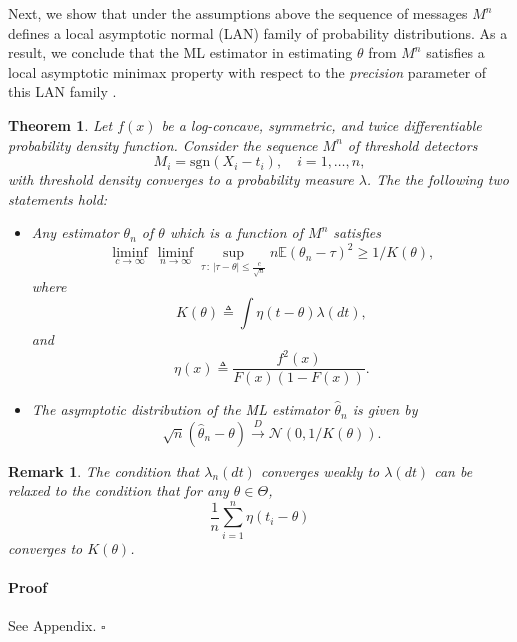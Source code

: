 \documentclass[letterpaper, conference, 11pt]{IEEEtran}      %
\newtheorem{thm}{\bf{Theorem}}
\newtheorem{rem}{\bf {Remark}}
\newenvironment{proof}{\paragraph*{Proof}}{\hfill$\square$ \newline}
\newcommand{\sgn}{\mathrm{sgn} }
\begin{document}
Next, we show that under the assumptions above the sequence of messages $M^n$ defines a local asymptotic normal (LAN) family of probability distributions. As a result, we conclude that the ML estimator in estimating $\theta$ from $M^n$ satisfies a local asymptotic minimax property with respect to the \emph{precision} parameter of this LAN family \cite{van2000asymptotic}. 
\begin{thm} \label{thm:LAN}
Let $f(x)$ be a log-concave, symmetric, and twice differentiable probability density function. Consider the sequence $M^n$ of threshold detectors 
\[
M_i = \sgn(X_i - t_i),\quad i=1,\ldots,n,
\]
with threshold density converges to a probability measure $\lambda$. The the following two statements hold:
\begin{itemize}
\item[(i)] Any estimator ${\theta}_n$ of $\theta$ which is a function of $M^n$ satisfies
\[
\liminf_{c\rightarrow \infty}\, \liminf_{n\rightarrow \infty} \sup_{\tau\,:\,| \tau - \theta| \leq \frac{c}{\sqrt{n}} }  n \mathbb E \left({\theta}_n - \tau \right)^2 \geq 1/K(\theta),
\]
where 
\[
K(\theta) \triangleq \int \eta\left(t-\theta \right) \lambda(dt),
\]
and 
\[
 \eta(x) \triangleq \frac{ f^2\left( x \right)}{ F\left( x \right) \left(1-F(x) \right)}. 
\]
\item[(ii)] The asymptotic distribution of the ML estimator $\hat{\theta}_n$ is given by
\[
\sqrt{n}(\hat{\theta}_n - \theta) \overset{D}{\rightarrow} \mathcal N\left(0,1/K(\theta) \right).
\]
\end{itemize}
\end{thm}

\begin{rem}
The condition that $\lambda_n(dt)$ converges weakly to $\lambda(dt)$ can be relaxed to the condition that for any $\theta \in \Theta$, 
\[
\frac{1}{n} \sum_{i=1}^n  \eta \left( t_i-\theta \right)  
\]
converges to $K(\theta)$.
\end{rem}

\begin{proof}
See Appendix. 
\end{proof}
\end{document}
